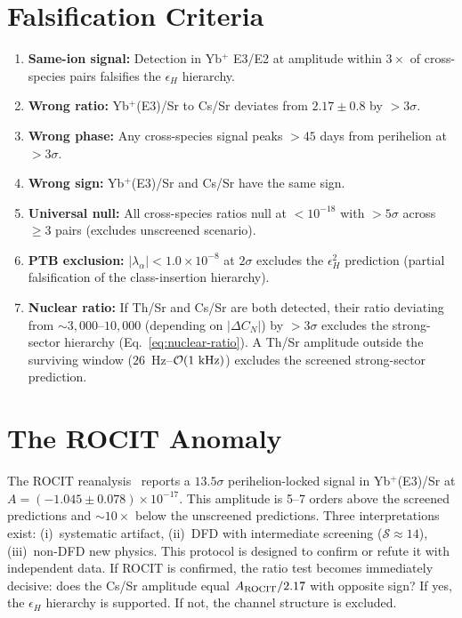 \documentclass[aps,prd,twocolumn,superscriptaddress,floatfix]{revtex4-2}
\newcommand{\epsH}{\epsilon_H}
\begin{document}
\section{Falsification Criteria}
\begin{enumerate}
\item \textbf{Same-ion signal:} Detection in Yb$^+$ E3/E2 at
  amplitude within $3\times$ of cross-species pairs falsifies
  the $\epsH$ hierarchy.
\item \textbf{Wrong ratio:} Yb$^+$(E3)/Sr to Cs/Sr deviates from
  $2.17 \pm 0.8$ by $> 3\sigma$.
\item \textbf{Wrong phase:} Any cross-species signal peaks
  $> 45$ days from perihelion at $> 3\sigma$.
\item \textbf{Wrong sign:} Yb$^+$(E3)/Sr and Cs/Sr have the
  same sign.
\item \textbf{Universal null:} All cross-species ratios null at
  $< 10^{-18}$ with $> 5\sigma$ across $\geq 3$ pairs
  (excludes unscreened scenario).
\item \textbf{PTB exclusion:} $|\lambda_\alpha| < 1.0 \times 10^{-8}$
  at $2\sigma$ excludes the $\epsH^2$ prediction (partial
  falsification of the class-insertion hierarchy).
\item \textbf{Nuclear ratio:} If Th/Sr and Cs/Sr are both detected,
  their ratio deviating from $\sim\!3{,}000$--$10{,}000$
  (depending on $|\Delta C_N|$) by $> 3\sigma$
  excludes the strong-sector hierarchy
  (Eq.~\ref{eq:nuclear-ratio}). A Th/Sr amplitude outside the
  surviving window ($26$~Hz--$\mathcal{O}(1~\rm kHz)$) excludes
  the screened strong-sector prediction.
\end{enumerate}
\section{The ROCIT Anomaly}
The ROCIT reanalysis~\cite{Alcock2025_ROCIT} reports a $13.5\sigma$
perihelion-locked signal in Yb$^+$(E3)/Sr at $A = (-1.045 \pm
0.078) \times 10^{-17}$. This amplitude is 5--7 orders above the
screened predictions and $\sim\!10\times$ below the unscreened
predictions. Three interpretations exist: (i)~systematic artifact,
(ii)~DFD with intermediate screening ($\mathcal{S} \approx 14$),
(iii)~non-DFD new physics. This protocol is designed to confirm
or refute it with independent data.
If ROCIT is confirmed, the ratio test becomes immediately
decisive: does the Cs/Sr amplitude equal $A_{\rm ROCIT}/2.17$
with opposite sign? If yes, the $\epsH$ hierarchy is supported.
If not, the channel structure is excluded.
\end{document}
